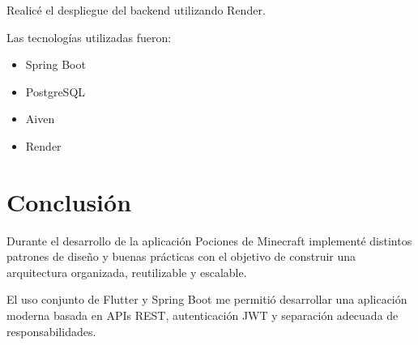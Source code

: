 \documentclass[12pt,a4paper]{article}
\begin{document}
Realicé el despliegue del backend utilizando Render.

Las tecnologías utilizadas fueron:

\begin{itemize}
    \item Spring Boot
    \item PostgreSQL
    \item Aiven
    \item Render
\end{itemize}

\section{Conclusión}

Durante el desarrollo de la aplicación Pociones de Minecraft implementé distintos patrones de diseño y buenas prácticas con el objetivo de construir una arquitectura organizada, reutilizable y escalable.

El uso conjunto de Flutter y Spring Boot me permitió desarrollar una aplicación moderna basada en APIs REST, autenticación JWT y separación adecuada de responsabilidades.
    
\end{document}
